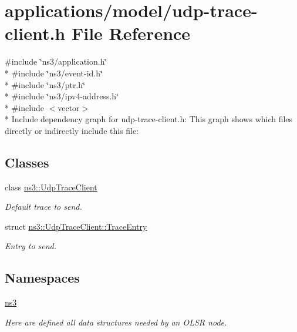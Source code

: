 \hypertarget{udp-trace-client_8h}{}\section{applications/model/udp-\/trace-\/client.h File Reference}
\label{udp-trace-client_8h}
{\ttfamily \#include \char`\"{}ns3/application.\+h\char`\"{}}\\*
{\ttfamily \#include \char`\"{}ns3/event-\/id.\+h\char`\"{}}\\*
{\ttfamily \#include \char`\"{}ns3/ptr.\+h\char`\"{}}\\*
{\ttfamily \#include \char`\"{}ns3/ipv4-\/address.\+h\char`\"{}}\\*
{\ttfamily \#include $<$vector$>$}\\*
Include dependency graph for udp-\/trace-\/client.h\+:
This graph shows which files directly or indirectly include this file\+:
\subsection*{Classes}
\begin{DoxyCompactItemize}
\item 
class \hyperlink{structns3_1_1UdpTraceClient}{ns3\+::\+Udp\+Trace\+Client}
\begin{DoxyCompactList}\small\item\em Default trace to send. \end{DoxyCompactList}\item 
struct \hyperlink{structns3_1_1UdpTraceClient_1_1TraceEntry}{ns3\+::\+Udp\+Trace\+Client\+::\+Trace\+Entry}
\begin{DoxyCompactList}\small\item\em Entry to send. \end{DoxyCompactList}\end{DoxyCompactItemize}
\subsection*{Namespaces}
\begin{DoxyCompactItemize}
\item 
 \hyperlink{namespacens3}{ns3}
\begin{DoxyCompactList}\small\item\em Here are defined all data structures needed by an O\+L\+SR node. \end{DoxyCompactList}\end{DoxyCompactItemize}
